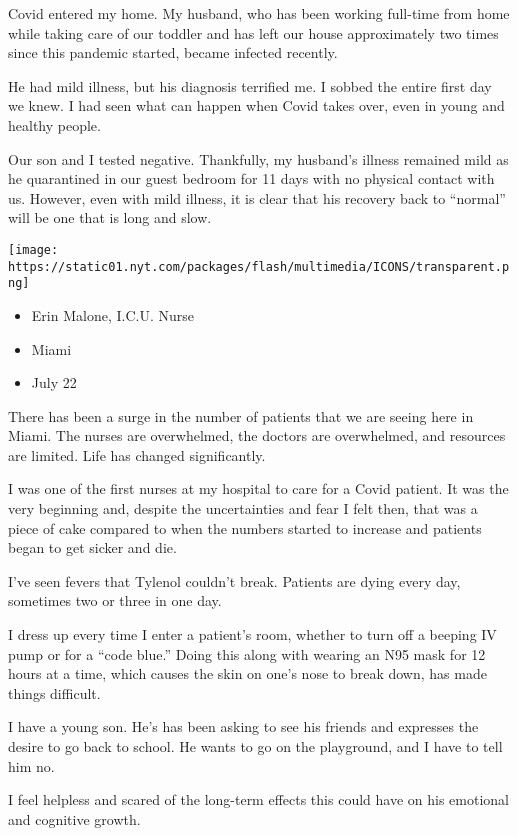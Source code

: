 Covid entered my home. My husband, who has been working full-time from
home while taking care of our toddler and has left our house
approximately two times since this pandemic started, became infected
recently.

He had mild illness, but his diagnosis terrified me. I sobbed the entire
first day we knew. I had seen what can happen when Covid takes over,
even in young and healthy people.

Our son and I tested negative. Thankfully, my husband's illness remained
mild as he quarantined in our guest bedroom for 11 days with no physical
contact with us. However, even with mild illness, it is clear that his
recovery back to ``normal'' will be one that is long and slow.

\texttt{[image: https://static01.nyt.com/packages/flash/multimedia/ICONS/transparent.png]}

\begin{itemize}
\tightlist
\item
  Erin Malone, I.C.U. Nurse
\item
  Miami
\item
  July 22
\end{itemize}

There has been a surge in the number of patients that we are seeing here
in Miami. The nurses are overwhelmed, the doctors are overwhelmed, and
resources are limited. Life has changed significantly.

I was one of the first nurses at my hospital to care for a Covid
patient. It was the very beginning and, despite the uncertainties and
fear I felt then, that was a piece of cake compared to when the numbers
started to increase and patients began to get sicker and die.

I've seen fevers that Tylenol couldn't break. Patients are dying every
day, sometimes two or three in one day.

I dress up every time I enter a patient's room, whether to turn off a
beeping IV pump or for a ``code blue.'' Doing this along with wearing an
N95 mask for 12 hours at a time, which causes the skin on one's nose to
break down, has made things difficult.

I have a young son. He's has been asking to see his friends and
expresses the desire to go back to school. He wants to go on the
playground, and I have to tell him no.

I feel helpless and scared of the long-term effects this could have on
his emotional and cognitive growth.

